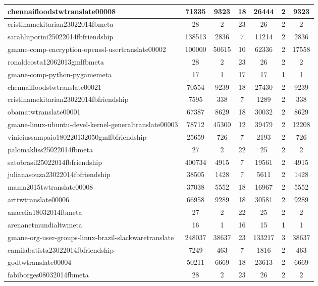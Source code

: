 \begin{table*}[h!]
\begin{center}
\begin{tabular}{| l | c | c | c | c | c | c |}
chennaifloodstwtranslate00008 & 71335  & 9323  & 18  & 26444  & 2  & 9323 \\\hline
cristinamekitarian23022014fbmeta & 28  & 2  & 23  & 26  & 2  & 2 \\\hline
sarahluporini25022014fbfriendship & 138513  & 2836  & 7  & 11214  & 2  & 2836 \\\hline
gmane-comp-encryption-openssl-usertranslate00002 & 100000  & 50615  & 10  & 62336  & 2  & 17558 \\\hline
ronaldcosta12062013gmlfbmeta & 28  & 2  & 23  & 26  & 2  & 2 \\\hline
gmane-comp-python-pygamemeta & 17  & 1  & 17  & 17  & 1  & 1 \\\hline
chennaifloodstwtranslate00021 & 70554  & 9239  & 18  & 27430  & 2  & 9239 \\\hline
cristinamekitarian23022014fbfriendship & 7595  & 338  & 7  & 1289  & 2  & 338 \\\hline
obamatwtranslate00001 & 67387  & 8629  & 18  & 30032  & 2  & 8629 \\\hline
gmane-linux-ubuntu-devel-kernel-generaltranslate00003 & 78712  & 45300  & 12  & 39479  & 2  & 12208 \\\hline
viniciussampaio180220132050gmlfbfriendship & 25659  & 726  & 7  & 2193  & 2  & 726 \\\hline
palomakliss25022014fbmeta & 27  & 2  & 22  & 25  & 2  & 2 \\\hline
satobrasil25022014fbfriendship & 400734  & 4915  & 7  & 19561  & 2  & 4915 \\\hline
julianasouza23022014fbfriendship & 38505  & 1428  & 7  & 5611  & 2  & 1428 \\\hline
mama2015twtranslate00008 & 37038  & 5552  & 18  & 16967  & 2  & 5552 \\\hline
arttwtranslate00006 & 66958  & 9289  & 18  & 30581  & 2  & 9289 \\\hline
anacelia18032014fbmeta & 27  & 2  & 22  & 25  & 2  & 2 \\\hline
arenanetmundialtwmeta & 16  & 1  & 16  & 15  & 1  & 1 \\\hline
gmane-org-user-groups-linux-brazil-slackwaretranslate & 248037  & 38637  & 23  & 133217  & 3  & 38637 \\\hline
camilabatista23022014fbfriendship & 7249  & 463  & 7  & 1816  & 2  & 463 \\\hline
godtwtranslate00004 & 50211  & 6669  & 18  & 23613  & 2  & 6669 \\\hline
fabiborges08032014fbmeta & 28  & 2  & 23  & 26  & 2  & 2 \\\hline

\end{tabular}
\end{center}
\end{table*}
